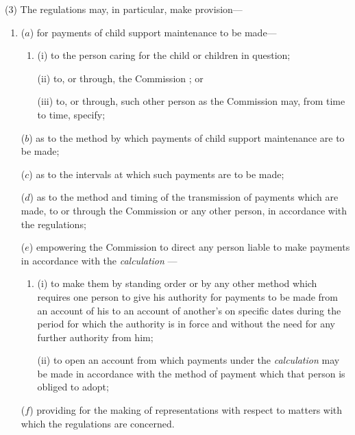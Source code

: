 \documentclass[12pt,a4paper]{article}
\begin{document}
(3) The regulations may, in particular, make provision—
\begin{enumerate}\item[]
($a$) for payments of child support maintenance to be made—
\begin{enumerate}\item[]
(i) to the person caring for the child or children in question;

(ii) to, or through, the 
Commission%
; or

(iii) to, or through, such other person as the 
Commission  %
may, from time to time, specify;
\end{enumerate}

($b$) as to the method by which payments of child support maintenance are to be made;

($c$) as to the intervals at which such payments are to be made;

($d$) as to the method and timing of the transmission of payments which are made, to or through the 
Commission  %
or any other person, in accordance with the regulations;

($e$) empowering the 
Commission  %
to direct any person liable to make payments in accordance with the 
\emph{calculation}%
—
\begin{enumerate}\item[]
(i) to make them by standing order or by any other method which requires one person to give his authority for payments to be made from an account of his to an account of another’s on specific dates during the period for which the authority is in force and without the need for any further authority from him;

(ii) to open an account from which payments under the 
\emph{calculation}  %
may be made in accordance with the method of payment which that person is obliged to adopt;
\end{enumerate}

($f$) providing for the making of representations with respect to matters with which the regulations are concerned.
\end{enumerate}
\end{document}
